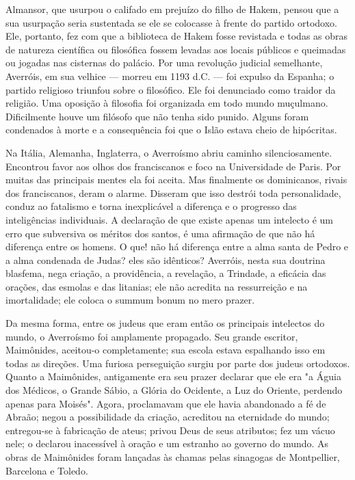\documentclass[11pt,a5paper,twoside,openany]{book}
\begin{document}
Almansor, que usurpou o califado em prejuízo do filho de Hakem, pensou que a sua usurpação seria sustentada se ele se colocasse à frente do partido ortodoxo. Ele, portanto, fez com que a biblioteca de Hakem fosse revistada e todas as obras de natureza científica ou filosófica fossem levadas aos locais públicos e queimadas ou jogadas nas cisternas do palácio. Por uma revolução judicial semelhante, Averróis, em sua velhice — morreu em 1193 d.C. — foi expulso da Espanha; o partido religioso triunfou sobre o filosófico. Ele foi denunciado como traidor da religião. Uma oposição à filosofia foi organizada em todo mundo muçulmano. Dificilmente houve um filósofo que não tenha sido punido. Alguns foram condenados à morte e a consequência foi que o Islão estava cheio de hipócritas.

Na Itália, Alemanha, Inglaterra, o Averroísmo abriu caminho silenciosamente. Encontrou favor aos olhos dos franciscanos e foco na Universidade de Paris. Por muitas das principais mentes ela foi aceita. Mas finalmente os dominicanos, rivais dos franciscanos, deram o alarme. Disseram que isso destrói toda personalidade, conduz ao fatalismo e torna inexplicável a diferença e o progresso das inteligências individuais. A declaração de que existe apenas um intelecto é um erro que subversiva os méritos dos santos, é uma afirmação de que não há diferença entre os homens. O que! não há diferença entre a alma santa de Pedro e a alma condenada de Judas? eles são idênticos? Averróis, nesta sua doutrina blasfema, nega criação, a providência, a revelação, a Trindade, a eficácia das orações, das esmolas e das litanias; ele não acredita na ressurreição e na imortalidade; ele coloca o summum bonum no mero prazer.

Da mesma forma, entre os judeus que eram então os principais intelectos do mundo, o Averroísmo foi amplamente propagado. Seu grande escritor, Maimônides, aceitou-o completamente; sua escola estava espalhando isso em todas as direções. Uma furiosa perseguição surgiu por parte dos judeus ortodoxos. Quanto a Maimônides, antigamente era seu prazer declarar que ele era "a Águia dos Médicos, o Grande Sábio, a Glória do Ocidente, a Luz do Oriente, perdendo apenas para Moisés". Agora, proclamavam que ele havia abandonado a fé de Abraão; negou a possibilidade da criação, acreditou na eternidade do mundo; entregou-se à fabricação de ateus; privou Deus de seus atributos; fez um vácuo nele; o declarou inacessível à oração e um estranho ao governo do mundo. As obras de Maimônides foram lançadas às chamas pelas sinagogas de Montpellier, Barcelona e Toledo.
\end{document}

